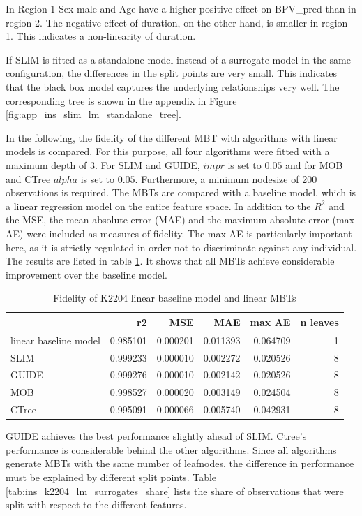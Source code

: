 In Region 1 Sex male and Age have a higher positive effect on  BPV\_pred than in region 2. The negative effect of duration, on the other hand, is smaller in region 1. This indicates a non-linearity of duration.

If SLIM is fitted as a standalone model instead of a surrogate model in the same configuration, the differences in the split points are very small. This indicates that the black box model captures the underlying relationships very well. The corresponding tree is shown in the appendix in Figure \ref{fig:app_ins_slim_lm_standalone_tree}.

In the following, the fidelity of the different MBT with algorithms with linear models is compared. For this purpose, all four algorithms were fitted with a maximum depth of 3. For SLIM and GUIDE, $impr$ is set to $0.05$ and for MOB and CTree $alpha$ is set to $0.05$. Furthermore, a minimum nodesize of 200 observations is required.
The MBTs are compared with a baseline model, which is a linear regression model on the entire feature space. In addition to the $R^2$ and the MSE, the mean absolute error (MAE) and the maximum absolute error (max AE) were included as measures of fidelity. The max AE is particularly important here, as it is strictly regulated in order not to discriminate against any individual. 
The results are listed in table \ref{tab:ins_k2204_lm_surrogates_perf}. It shows that all MBTs achieve considerable improvement over the baseline model.

\begin{table}[!htb]

\caption{Fidelity of K2204 linear baseline model and linear MBTs}
\centering
\begin{tabular}[t]{l|r|r|r|r|r}
\hline
  & r2 & MSE & MAE & max AE & n leaves\\
\hline
linear baseline model & 0.985101 & 0.000201 & 0.011393 & 0.064709 & 1\\
\hline
SLIM & 0.999233 & 0.000010 & 0.002272 & 0.020526 & 8\\
GUIDE & 0.999276 & 0.000010 & 0.002142 & 0.020526 & 8\\
MOB & 0.998527 & 0.000020 & 0.003149 & 0.024504 & 8\\
CTree & 0.995091 & 0.000066 & 0.005740 & 0.042931 & 8\\
\hline
\end{tabular}
\label{tab:ins_k2204_lm_surrogates_perf}
\end{table}

GUIDE achieves the best performance slightly ahead of SLIM. Ctree's performance is considerable behind the other algorithms.
Since all algorithms generate MBTs with the same number of leafnodes, the difference in performance must be explained by different split points.
Table \ref{tab:ins_k2204_lm_surrogates_share} lists the share of observations that were split with respect to the different features.

